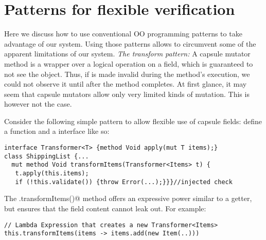 \saveSpace
\section{Patterns for flexible verification}
\label{s:patterns}
\saveSpace
Here we discuss how to use conventional OO programming patterns to take advantage of our system. Using those
patterns allows to circumvent some of the apparent limitations of our system.
\noindent\textit{The transform pattern:}
A capsule mutator method is a wrapper over a logical operation on a field, which is guaranteed to not see the \Q@this@ object.
Thus, if \Q@this@ is made invalid during 
the method's execution, we could not observe it until after the method completes.
At first glance, it may seem that capsule mutators allow only very limited kinds of mutation.
This is however not the case. 

Consider the following
simple pattern to allow flexible use of capsule fields: define a \Q@transform@ function and a \Q@ItemTransformer@ interface like so:


%
%
%
%
%
%
%

\saveSpace
\begin{lstlisting}
interface Transformer<T> {method Void apply(mut T items);}
class ShippingList {...
  mut method Void transformItems(Transformer<Items> t) {
   t.apply(this.items);
   if (!this.validate()) {throw Error(...);}}}//injected check
\end{lstlisting}
The \Q@.transformItems()@ method 
offers an expressive power similar to a
\Q@mut@ getter, but ensures that 
the field content cannot leak out.
For example:
\begin{lstlisting}[escapechar=\%]
// Lambda Expression that creates a new Transformer<Items>
this.transformItems(items -> items.add(new Item(..)))
\end{lstlisting}

